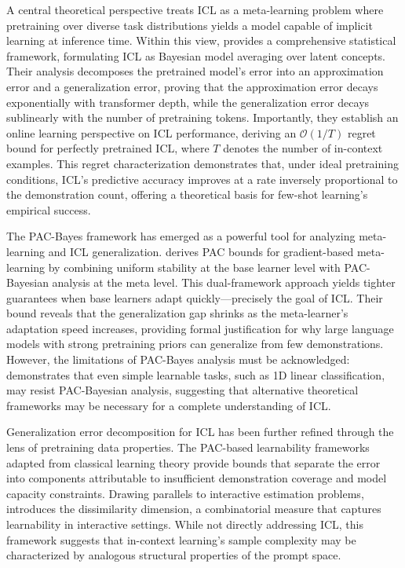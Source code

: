 \documentclass[11pt]{article}
\begin{document}
A central theoretical perspective treats ICL as a meta-learning problem where pretraining over diverse task distributions yields a model capable of implicit learning at inference time. Within this view, \cite{ref46} provides a comprehensive statistical framework, formulating ICL as Bayesian model averaging over latent concepts. Their analysis decomposes the pretrained model's error into an approximation error and a generalization error, proving that the approximation error decays exponentially with transformer depth, while the generalization error decays sublinearly with the number of pretraining tokens. Importantly, they establish an online learning perspective on ICL performance, deriving an \(\mathcal{O}(1/T)\) regret bound for perfectly pretrained ICL, where \(T\) denotes the number of in-context examples. This regret characterization demonstrates that, under ideal pretraining conditions, ICL's predictive accuracy improves at a rate inversely proportional to the demonstration count, offering a theoretical basis for few-shot learning's empirical success.

The PAC-Bayes framework has emerged as a powerful tool for analyzing meta-learning and ICL generalization. \cite{ref76} derives PAC bounds for gradient-based meta-learning by combining uniform stability at the base learner level with PAC-Bayesian analysis at the meta level. This dual-framework approach yields tighter guarantees when base learners adapt quickly---precisely the goal of ICL. Their bound reveals that the generalization gap shrinks as the meta-learner's adaptation speed increases, providing formal justification for why large language models with strong pretraining priors can generalize from few demonstrations. However, the limitations of PAC-Bayes analysis must be acknowledged: \cite{ref77} demonstrates that even simple learnable tasks, such as 1D linear classification, may resist PAC-Bayesian analysis, suggesting that alternative theoretical frameworks may be necessary for a complete understanding of ICL.

Generalization error decomposition for ICL has been further refined through the lens of pretraining data properties. The PAC-based learnability frameworks adapted from classical learning theory provide bounds that separate the error into components attributable to insufficient demonstration coverage and model capacity constraints. Drawing parallels to interactive estimation problems, \cite{ref78} introduces the dissimilarity dimension, a combinatorial measure that captures learnability in interactive settings. While not directly addressing ICL, this framework suggests that in-context learning's sample complexity may be characterized by analogous structural properties of the prompt space.
\end{document}
